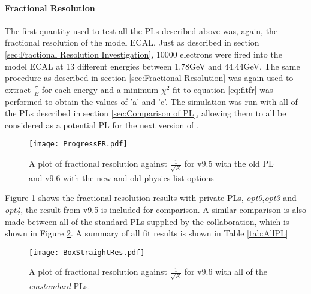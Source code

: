 \paragraph{Fractional Resolution}
The first quantity used to test all the PLs described above was, again, the fractional resolution of the model ECAL.  Just as described in section \ref{sec:Fractional Resolution Investigation}, 10000 electrons were fired into the model ECAL at 13 different energies between 1.78GeV and 44.44GeV.  The same procedure as described in section \ref{sec:Fractional Resolution} was again used to extract $\frac{\sigma}{E}$ for each energy and a minimum $\chi^2$ fit to equation \ref{eq:fitfr} was performed to obtain the values of 'a' and 'c'.  The simulation was run with all of the PLs described in section \ref{sec:Comparison of PL}, allowing them to all be considered as a potential PL for the next version of \gauss.
\begin{figure}[h]
  \centering
  \texttt{[image: ProgressFR.pdf]}
  \caption{A plot of fractional resolution against $\frac{1}{\sqrt{E}}$ for \geant v9.5 with the old PL and v9.6 with the new and old physics list options}
  \label{fig:LHCbPLStraightFR}
\end{figure}

Figure \ref{fig:LHCbPLStraightFR} shows the fractional resolution results with \lhcb private PLs, \textit{opt0},\textit{opt3} and \textit{opt4}, the result from \geant v9.5 is included for comparison.  A similar comparison is also made between all of the standard PLs supplied by the \geant collaboration, which is shown in Figure \ref{fig:BoxPLStraightFR}.  A summary of all fit results is shown in Table \ref{tab:AllPL}
\begin{figure}[h]
  \centering
  \texttt{[image: BoxStraightRes.pdf]}
  \caption{A plot of fractional resolution against $\frac{1}{\sqrt{E}}$ for \geant v9.6 with all of the \textit{emstandard} PLs.}
  \label{fig:BoxPLStraightFR}
\end{figure}

